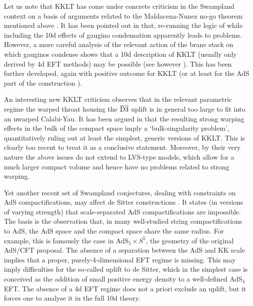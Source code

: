 \documentclass[12pt]{article}
\newcommand{\ol}{\overline}
\numberwithin{equation}{section}
\begin{document}
Let us note that KKLT has come under concrete criticism in the Swampland context on a basis of arguments related to the Maldacena-Nunez no-go theorem mentioned above \cite{Maldacena:2000mw}. It has been pointed out in \cite{Moritz:2017xto} that, re-running the logic of \cite{Maldacena:2000mw} while including the 10d effects of gaugino condensation apparently leads to problems. However, a more careful analysis of the relevant action of the brane stack on which gauginos condense \cite{Hamada:2018qef, Kallosh:2019oxv} shows that a 10d description of KKLT (usually only derived by 4d EFT methods) may be possible \cite{Hamada:2019ack, Carta:2019rhx} (see however \cite{Gautason:2019jwq}). This has been further developed, again with positive outcome for KKLT \cite{Kachru:2019dvo}
(or at least for the AdS part of the construction \cite{Bena:2019mte}). 

An interesting new KKLT criticism \cite{Carta:2019rhx} observes that in the relevant parametric regime the warped throat housing the $\ol{\rm D3}$ uplift  is in general too large to fit into an uwarped Calabi-Yau. It has been argued in \cite{Gao:2020xqh} that the resulting strong warping effects in the bulk of the compact space imply a `bulk-singularity problem', quantitatively ruling out at least the simplest, generic versions of KKLT. This is clearly too recent to treat it as a conclusive statement. Moreover, by their very nature the above issues do not extend to LVS-type models, which allow for a much larger compact volume and hence have no problems related to strong warping.

Yet another recent set of Swampland conjectures, dealing with constraints on AdS compactifications, may affect de Sitter constructions \cite{Gautason:2015tig, Gautason:2018gln, Lust:2019zwm}. It states (in versions of varying strength) that scale-separated AdS compactifications are impossible. The  basis is the observation that, in many well-studied string compactifications to AdS, the AdS space and the compact space share the same radius. For example, this is famously the case in AdS$_5\times S^5$, the geometry of the original AdS/CFT proposal. The absence of a separation between the AdS and KK scale implies that a proper, purely-4-dimensional EFT regime is missing. This may imply difficulties for the so-called uplift to de Sitter, which in the simplest case is conceived as the addition of small positive energy density to a well-defined AdS$_4$ EFT. The absence of a 4d EFT regime does not a priori exclude an uplift, but it forces one to analyse it in the full 10d theory. 
\end{document}
